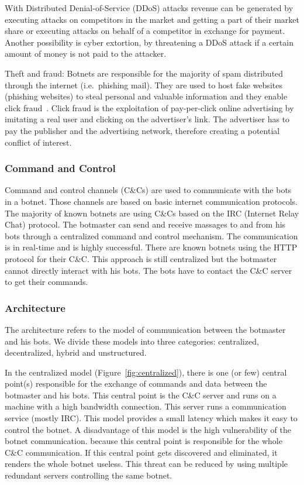 With Distributed Denial-of-Service (DDoS) attacks revenue can be generated by executing attacks on competitors in the market and getting a part of their market share or executing attacks on behalf of a competitor in exchange for payment.
Another possibility is cyber extortion, by threatening a DDoS attack if a certain amount of money is not paid to the attacker.

Theft and fraud: Botnets are responsible for the majority of spam distributed through the internet (i.e.\ phishing mail).
They are used to host fake websites (phishing websites) to steal personal and valuable information and they enable click fraud~\cite{vanEeten08}.
Click fraud is the exploitation of pay-per-click online advertising by imitating a real user and clicking on the advertiser's link.
The advertiser has to pay the publisher and the advertising network, therefore creating a potential conflict of interest.

\subsubsection{Command and Control}
Command and control channels (C\&Cs) are used to communicate with the bots in a botnet.
Those channels are based on basic internet communication protocols.
The majority of known botnets are using C\&Cs based on the IRC (Internet Relay Chat) protocol.
The botmaster can send and receive massages to and from his bots through a centralized command and control mechanism.
The communication is in real-time and is highly successful.
There are known botnets using the HTTP protocol for their C\&C. This approach is still centralized but the botmaster cannot directly interact with his bots.
The bots have to contact the C\&C server to get their commands.~\cite{Gu08}

\subsubsection{Architecture}
The architecture refers to the model of communication between the botmaster and his bots.
We divide these models into three categories: centralized, decentralized, hybrid and unstructured.

In the centralized model (Figure~\ref{fig:centralized}), there is one (or few) central point(s) responsible for the exchange of commands and data between the botmaster and his bots.
This central point is the C\&C server and runs on a machine with a high bandwidth connection.
This server runs a communication service (mostly IRC).
This model provides a small latency which makes it easy to control the botnet.
A disadvantage of this model is the high vulnerability of the botnet communication.
because this central point is responsible for the whole C\&C communication.
If this central point gets discovered and eliminated, it renders the whole botnet useless.
This threat can be reduced by using multiple redundant servers controlling the same botnet.\cite{Zeidanloo09}

